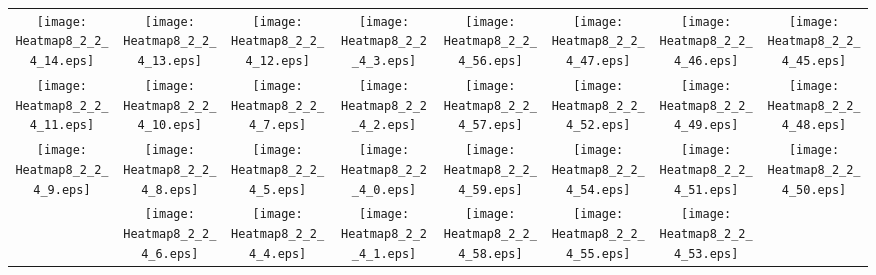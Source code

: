 \documentclass{standalone}
\begin{document}
\begin{tabular}{ *8{c} }
\texttt{[image: Heatmap8\_2\_2\_4\_14.eps]} & \texttt{[image: Heatmap8\_2\_2\_4\_13.eps]} & \texttt{[image: Heatmap8\_2\_2\_4\_12.eps]} & \texttt{[image: Heatmap8\_2\_2\_4\_3.eps]} & \texttt{[image: Heatmap8\_2\_2\_4\_56.eps]} & \texttt{[image: Heatmap8\_2\_2\_4\_47.eps]} & \texttt{[image: Heatmap8\_2\_2\_4\_46.eps]} & \texttt{[image: Heatmap8\_2\_2\_4\_45.eps]} \\
\texttt{[image: Heatmap8\_2\_2\_4\_11.eps]} & \texttt{[image: Heatmap8\_2\_2\_4\_10.eps]} & \texttt{[image: Heatmap8\_2\_2\_4\_7.eps]} & \texttt{[image: Heatmap8\_2\_2\_4\_2.eps]} & \texttt{[image: Heatmap8\_2\_2\_4\_57.eps]} & \texttt{[image: Heatmap8\_2\_2\_4\_52.eps]} & \texttt{[image: Heatmap8\_2\_2\_4\_49.eps]} & \texttt{[image: Heatmap8\_2\_2\_4\_48.eps]} \\
\texttt{[image: Heatmap8\_2\_2\_4\_9.eps]} & \texttt{[image: Heatmap8\_2\_2\_4\_8.eps]} & \texttt{[image: Heatmap8\_2\_2\_4\_5.eps]} & \texttt{[image: Heatmap8\_2\_2\_4\_0.eps]} & \texttt{[image: Heatmap8\_2\_2\_4\_59.eps]} & \texttt{[image: Heatmap8\_2\_2\_4\_54.eps]} & \texttt{[image: Heatmap8\_2\_2\_4\_51.eps]} & \texttt{[image: Heatmap8\_2\_2\_4\_50.eps]} \\
 & \texttt{[image: Heatmap8\_2\_2\_4\_6.eps]} & \texttt{[image: Heatmap8\_2\_2\_4\_4.eps]} & \texttt{[image: Heatmap8\_2\_2\_4\_1.eps]} & \texttt{[image: Heatmap8\_2\_2\_4\_58.eps]} & \texttt{[image: Heatmap8\_2\_2\_4\_55.eps]} & \texttt{[image: Heatmap8\_2\_2\_4\_53.eps]} &  
\end{tabular}
\end{document}
